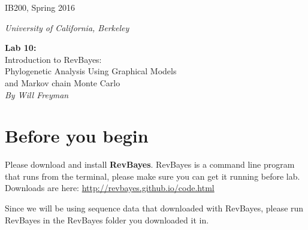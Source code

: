 \documentclass[11pt]{article}
\begin{document}
\noindent
\large
\begin{minipage}{0.5\textwidth}
\begin{flushleft} 
IB200, Spring 2016
\end{flushleft}
\end{minipage}
\begin{minipage}{0.5\textwidth}
\begin{flushright} 
\textit{University of California, Berkeley}
\end{flushright}
\end{minipage}

\vspace{0.5cm}


\begin{center}
\Large \textbf{Lab 10:} \\
Introduction to RevBayes: \\
Phylogenetic Analysis Using Graphical Models \\
and Markov chain Monte Carlo \\
\normalsize
\textit{By Will Freyman}
\end{center}

\vspace{0.5cm}

\section{Before you begin}

Please download and install \textbf{RevBayes}.
RevBayes is a command line program that runs from the terminal,
please make sure you can get it running before lab.
Downloads are here: \url{http://revbayes.github.io/code.html}

Since we will be using sequence data that downloaded with RevBayes,
please run RevBayes in the RevBayes folder you downloaded it in.
\end{document}
